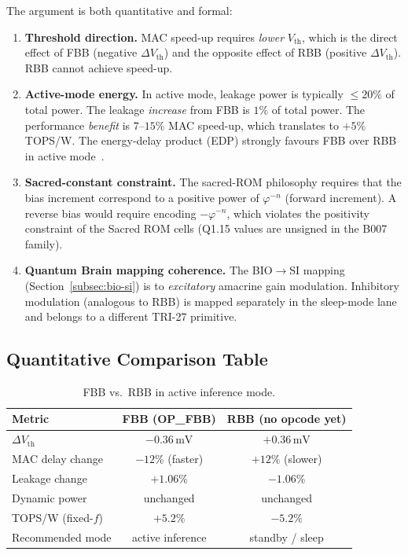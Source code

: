 The argument is both quantitative and formal:

\begin{enumerate}
  \item \textbf{Threshold direction.}
        MAC speed-up requires \emph{lower} $V_{\mathrm{th}}$, which is
        the direct effect of FBB (negative $\Delta V_{\mathrm{th}}$)
        and the opposite effect of RBB (positive $\Delta V_{\mathrm{th}}$).
        RBB cannot achieve speed-up.

  \item \textbf{Active-mode energy.}
        In active mode, leakage power is typically $\leq 20\%$ of
        total power.  The leakage \emph{increase} from FBB is $1\%$
        of total power.  The performance \emph{benefit} is $7$--$15\%$
        MAC speed-up, which translates to $+5\%$ TOPS/W.  The
        energy-delay product (EDP) strongly favours FBB over RBB in
        active mode~\cite{HoroBoseDAC2008}.

  \item \textbf{Sacred-constant constraint.}
        The sacred-ROM philosophy requires that the bias increment
        correspond to a positive power of $\varphi^{-n}$ (forward
        increment).  A reverse bias would require encoding
        $-\varphi^{-n}$, which violates the positivity constraint
        of the Sacred ROM cells (Q1.15 values are unsigned in the
        B007 family).

  \item \textbf{Quantum Brain mapping coherence.}
        The BIO$\to$SI mapping (Section~\ref{subsec:bio-si}) is to
        \emph{excitatory} amacrine gain modulation.  Inhibitory
        modulation (analogous to RBB) is mapped separately in
        the sleep-mode lane and belongs to a different TRI-27
        primitive.
\end{enumerate}

\subsection{Quantitative Comparison Table}
\label{subsec:rbb-table}

\begin{table}[htbp]
  \centering
  \caption{FBB vs.\ RBB in active inference mode.}
  \label{tab:fbb-vs-rbb}
  \begin{tabular}{@{}lcc@{}}
    \toprule
    Metric & FBB (OP\_FBB) & RBB (no opcode yet) \\
    \midrule
    $\Delta V_{\mathrm{th}}$ & $-0.36\,\mathrm{mV}$ & $+0.36\,\mathrm{mV}$ \\
    MAC delay change & $-12\%$ (faster) & $+12\%$ (slower) \\
    Leakage change   & $+1.06\%$ & $-1.06\%$ \\
    Dynamic power    & unchanged & unchanged \\
    TOPS/W (fixed-$f$) & $+5.2\%$ & $-5.2\%$ \\
    Recommended mode & active inference & standby / sleep \\
    \bottomrule
  \end{tabular}
\end{table}


